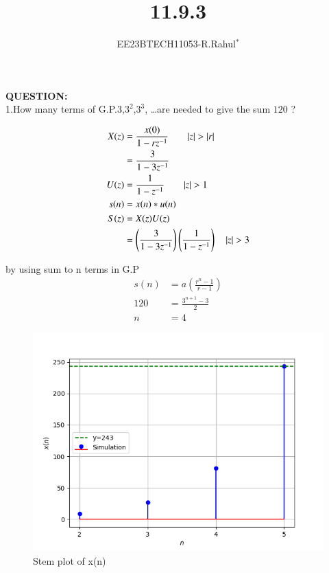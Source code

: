 \documentclass[journal,12pt,twocolumn]{IEEEtran}
\theoremstyle{remark}
\begin{document}

\vspace{3cm}
\title{\textbf{11.9.3}}
\author{EE23BTECH11053-R.Rahul$^{*}$%
}
\maketitle
\newpage
\bigskip

\textbf{QUESTION:}\\
1.How many terms of G.P.$3$,$3^2$,$3^3$, \ldots are needed to give the sum $120$ ?\\

\solution
\fi
\vspace{-0.25cm}

\begin{center}
    
\begin{align}
      X(z)&=\frac{x(0)}{1-rz^{-1}} \qquad |z|>|r|\\
      &=\frac{3}{1-3z^{-1}}\\
      U(z)&=\frac{1}{1-z^{-1}} \qquad |z|>1\\
      s(n)&= x(n)*u(n)\\
      S(z)&=X(z)U(z)\\
&=\brak{ \frac{3}{1-3z^{-1}}}\brak{\frac{1}{1-z^{-1}}}\quad|z| > 3 \end{align}
\end{center}
by using sum to n terms in G.P
\begin{align}
    s(n)&=a(\frac{r^{n}-1}{r-1})\\
    120&=\frac{3^{n+1}-3}{2}\\
    n&=4
\end{align}

\begin{figure}
  
  \includegraphics[width=\columnwidth]{ncert-maths/11/9/3/13/figs/download.png}
  \caption{Stem plot of x(n)}
\end{figure}
\end{document}
